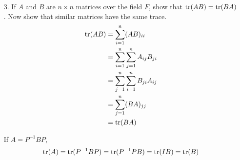 \documentclass{article}
\begin{document}
\begin{enumerate}[listparindent=\parindent]
\item[3.] If \(A\) and \(B\) are \(n \times n\) matrices over the field \(F\), show that \(\operatorname{tr}(AB) = \operatorname{tr}(BA)\).
    Now show that similar matrices have the same trace.
    \begin{align*}
        \operatorname{tr}(AB) &= \sum_{i = 1}^{n} (AB)_{ii} \\
                &= \sum_{i = 1}^{n} \sum_{j = 1}^{n} A_{ij}B_{ji} \\
                &= \sum_{j = 1}^{n} \sum_{i = 1}^{n} B_{ji}A_{ij} \\
                &= \sum_{j = 1}^{n} (BA)_{jj} \\
                &= \operatorname{tr}(BA)
    \end{align*}

    If \(A = P^{-1}BP\),
    \begin{gather*}
        \operatorname{tr}(A) = \operatorname{tr}(P^{-1}BP) = \operatorname{tr}(P^{-1}PB) = \operatorname{tr}(IB) = \operatorname{tr}(B)
    \end{gather*}


\end{enumerate}
\end{document}
